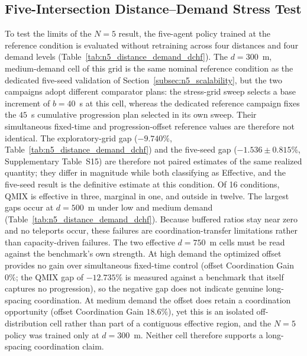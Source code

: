 \documentclass[review,12pt]{elsarticle}
\begin{document}
\subsection{Five-Intersection Distance--Demand Stress Test}
\label{subsec:n5_distance_demand_stress}

To test the limits of the $N=5$ result, the five-agent policy trained at the reference condition is evaluated without retraining across four distances and four demand levels (Table~\ref{tab:n5_distance_demand_dchf}). The $d=300$~m, medium-demand cell of this grid is the same nominal reference condition as the dedicated five-seed validation of Section~\ref{subsec:n5_scalability}, but the two campaigns adopt different comparator plans: the stress-grid sweep selects a base increment of $b=40$~s at this cell, whereas the dedicated reference campaign fixes the $45$~s cumulative progression plan selected in its own sweep. Their simultaneous fixed-time and progression-offset reference values are therefore not identical. The exploratory-grid gap ($-9.740\%$, Table~\ref{tab:n5_distance_demand_dchf}) and the five-seed gap ($-1.536\pm0.815\%$, Supplementary Table~S15) are therefore not paired estimates of the same realized quantity; they differ in magnitude while both classifying as Effective, and the five-seed result is the definitive estimate at this condition. Of 16 conditions, QMIX is effective in three, marginal in one, and outside in twelve. The largest gaps occur at $d=500$~m under low and medium demand (Table~\ref{tab:n5_distance_demand_dchf}). Because buffered ratios stay near zero and no teleports occur, these failures are coordination-transfer limitations rather than capacity-driven failures. The two effective $d=750$~m cells must be read against the benchmark's own strength. At high demand the optimized offset provides no gain over simultaneous fixed-time control (offset Coordination Gain $0\%$; the QMIX gap of $-12.735\%$ is measured against a benchmark that itself captures no progression), so the negative gap does not indicate genuine long-spacing coordination. At medium demand the offset does retain a coordination opportunity (offset Coordination Gain $18.6\%$), yet this is an isolated off-distribution cell rather than part of a contiguous effective region, and the $N=5$ policy was trained only at $d=300$~m. Neither cell therefore supports a long-spacing coordination claim.
\end{document}
